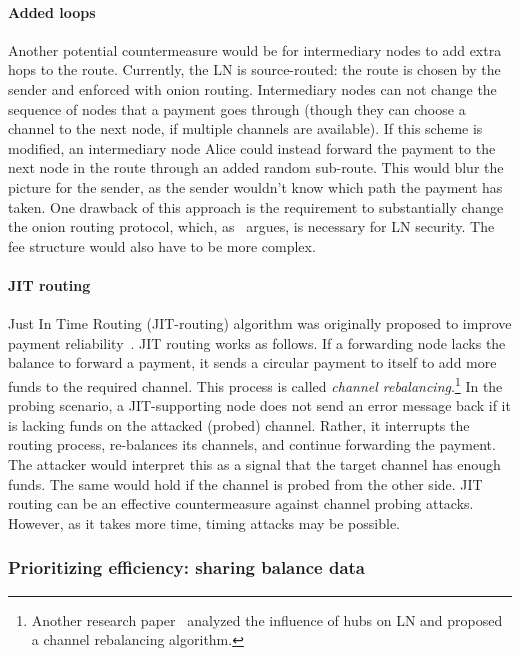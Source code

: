 \paragraph{Added loops}
Another potential countermeasure would be for intermediary nodes to add extra hops to the route.
Currently, the LN is source-routed: the route is chosen by the sender and enforced with onion routing.
Intermediary nodes can not change the sequence of nodes that a payment goes through (though they can choose a channel to the next node, if multiple channels are available).
If this scheme is modified, an intermediary node Alice could instead forward the payment to the next node in the route through an added random sub-route.
This would blur the picture for the sender, as the sender wouldn't know which path the payment has taken.
One drawback of this approach is the requirement to substantially change the onion routing protocol, which, as~\cite{Malavolta2019} argues, is necessary for LN security.
The fee structure would also have to be more complex.

\paragraph{JIT routing}
Just In Time Routing (JIT-routing) algorithm was originally proposed to improve payment reliability~\cite{Pickhardt2019, Pickhardt2019a}.
JIT routing works as follows.
If a forwarding node lacks the balance to forward a payment, it sends a circular payment to itself to add more funds to the required channel.
This process is called \textit{channel rebalancing}.\footnote{Another research paper~\cite{Conoscenti2019} analyzed the influence of hubs on LN and proposed a channel rebalancing algorithm.}
In the probing scenario, a JIT-supporting node does not send an error message back if it is lacking funds on the attacked (probed) channel.
Rather, it interrupts the routing process, re-balances its channels, and continue forwarding the payment.
The attacker would interpret this as a signal that the target channel has enough funds.
The same would hold if the channel is probed from the other side.
JIT routing can be an effective countermeasure against channel probing attacks.
However, as it takes more time, timing attacks may be possible. 


\subsubsection*{Prioritizing efficiency: sharing balance data}

